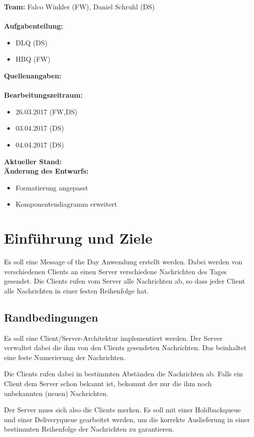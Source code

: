 \documentclass{article}
\begin{document}
\textbf{Team:} Falco Winkler (FW), Daniel Schruhl (DS)\\
\\
\textbf{Aufgabenteilung:}
\begin{itemize}
    \item DLQ (DS)
	\item HBQ (FW)
\end{itemize}

\textbf{Quellenangaben:}\\
\\
\textbf{Bearbeitungszeitraum:}
\begin{itemize}
	\item 26.03.2017 (FW,DS)
	\item 03.04.2017 (DS)
	\item 04.04.2017 (DS)
\end{itemize}

\textbf{Aktueller Stand:}\\

\textbf{Änderung des Entwurfs:}
\begin{itemize}
    \item Formatierung angepasst
	\item Komponentendiagramm erweitert
\end{itemize}

\newpage
\tableofcontents 
\newpage

\section{Einführung und Ziele}
Es soll eine Message of the Day Anwendung erstellt werden. Dabei werden von verschiedenen Clients an einen Server verschiedene Nachrichten des Tages gesendet. Die Clients rufen vom Server alle Nachrichten ab, so dass jeder Client alle Nachrichten in einer festen Reihenfolge hat.

\subsection{Randbedingungen}
Es soll eine Client/Server-Architektur implementiert werden.
Der Server verwaltet dabei die ihm von den Clients gesendeten Nachrichten. Das beinhaltet eine feste Numerierung der Nachrichten.

Die Clients rufen dabei in bestimmten Abständen die Nachrichten ab. Falls ein Client dem Server schon bekannt ist, bekommt der nur die ihm noch unbekannten (neuen) Nachrichten.

Der Server muss sich also die Clients merken. Es soll mit einer Holdbackqueue und einer Deliveryqueue gearbeitet werden, um die korrekte Auslieferung in einer bestimmten Reihenfolge der Nachrichten zu garantieren.
\end{document}
